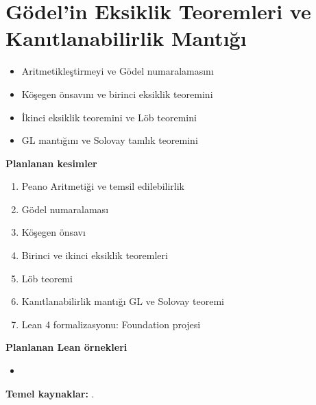 \chapter{Gödel'in Eksiklik Teoremleri ve Kanıtlanabilirlik Mantığı}\label{bol:godel}

\begin{bolumhedefleri}
\begin{itemize}
  \item Aritmetikleştirmeyi ve Gödel numaralamasını
  \item Köşegen önsavını ve birinci eksiklik teoremini
  \item İkinci eksiklik teoremini ve Löb teoremini
  \item GL mantığını ve Solovay tamlık teoremini
\end{itemize}
\end{bolumhedefleri}

\begin{taslakplan}
\textbf{Planlanan kesimler}
\begin{enumerate}[label=\thechapter.\arabic*, leftmargin=2.4em]
  \item Peano Aritmetiği ve temsil edilebilirlik
  \item Gödel numaralaması
  \item Köşegen önsavı
  \item Birinci ve ikinci eksiklik teoremleri
  \item Löb teoremi
  \item Kanıtlanabilirlik mantığı GL ve Solovay teoremi
  \item Lean 4 formalizasyonu: Foundation projesi
\end{enumerate}

\textbf{Planlanan Lean örnekleri}
\begin{itemize}
  \item {}
\end{itemize}

\textbf{Temel kaynaklar:} \citet{godel1931,smith2013,boolos1993,solovay1976,saitou2026,foundation}.
\end{taslakplan}

